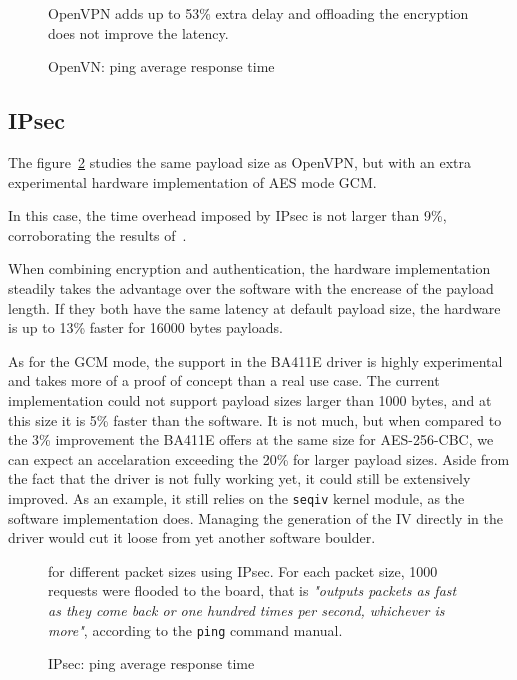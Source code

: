 \begin{figure}[ht]

\caption{OpenVN: ping average response time}{OpenVPN adds up to 53\% extra delay and offloading the encryption does not improve the latency.}
\label{fig:ping-benchmark-openvpn}
\end{figure}

\subsection{IPsec}
The figure~\ref{fig:ping-benchmark-ipsec} studies the same payload size as OpenVPN, but with an extra experimental hardware implementation of AES mode GCM.

\noindent In this case, the time overhead imposed by IPsec is not larger than 9\%, corroborating the results of~\citet{Xenakis20063225}.

When combining encryption and authentication, the hardware implementation steadily takes the advantage over the software with the encrease of the payload length.
If they both have the same latency at default payload size, the hardware is up to 13\% faster for 16000 bytes payloads.

As for the GCM mode, the support in the BA411E driver is highly experimental and takes more of a proof of concept than a real use case.
The current implementation could not support payload sizes larger than 1000 bytes, and at this size it is 5\% faster than the software.
It is not much, but when compared to the 3\% improvement the BA411E offers at the same size for AES-256-CBC, we can expect an accelaration exceeding the 20\% for larger payload sizes. %
Aside from the fact that the driver is not fully working yet, it could still be extensively improved.
As an example, it still relies on the \texttt{seqiv} kernel module, as the software implementation does.
Managing the generation of the IV directly in the driver would cut it loose from yet another software boulder.

\begin{figure}[ht]

\caption{IPsec: ping average response time}{for different packet sizes using IPsec. For each packet size, 1000 requests were flooded to the board, that is \textit{"outputs packets as fast as they come back or one hundred times per second, whichever is more"}, according to the \texttt{ping} command manual.} %
\label{fig:ping-benchmark-ipsec}
\end{figure}



